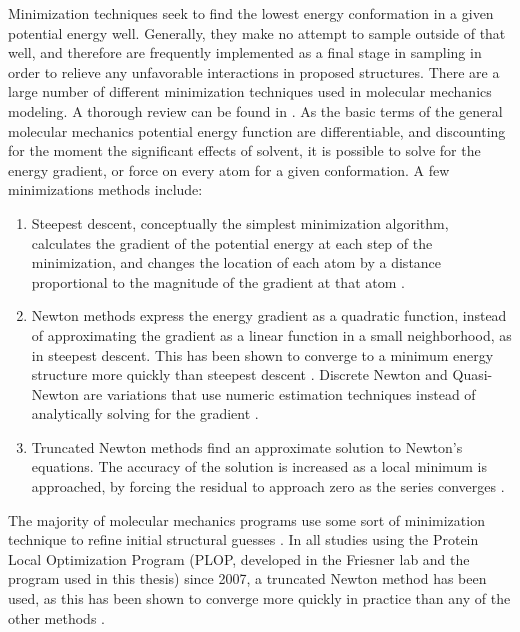 Minimization techniques seek to find the lowest energy conformation in a given potential energy well.
Generally, they make no attempt to sample outside of that well, and therefore are frequently implemented as a final stage in sampling in order to relieve any unfavorable interactions in proposed structures.
There are a large number of different minimization techniques used in molecular mechanics modeling.
A thorough review can be found in \cite{schlick2010molecular}.
As the basic terms of the general molecular mechanics potential energy function are differentiable, and discounting for the moment the significant effects of solvent, it is possible to solve for the energy gradient, or force on every atom for a given conformation.
A few minimizations methods include:
\begin{enumerate}
\item Steepest descent, conceptually the simplest minimization algorithm, calculates the gradient of the potential energy at each step of the minimization, and changes the location of each atom by a distance proportional to the magnitude of the gradient at that atom \cite{levitt1969refinement,bixon1967potential}.
\item Newton methods express the energy gradient as a quadratic function, instead of approximating the gradient as a linear function in a small neighborhood, as in steepest descent.
This has been shown to converge to a minimum energy structure more quickly than steepest descent \cite{ponder1987efficient}.  
Discrete Newton and Quasi-Newton are variations that use numeric estimation techniques instead of analytically solving for the gradient \cite{schlick2010molecular}.
\item Truncated Newton methods find an approximate solution to Newton's equations.
The accuracy of the solution is increased as a local minimum is approached, by forcing the residual to approach zero as the series converges \cite{dembo1983truncated}.
\end{enumerate}

The majority of molecular mechanics programs use some sort of minimization technique to refine initial structural guesses \cite{ponder1987efficient,levitt1969refinement,bixon1967potential,zhu2007multiscale}.
In all studies using the Protein Local Optimization Program (PLOP, developed in the Friesner lab and the program used in this thesis) since 2007, a truncated Newton method has been used, as this has been shown to converge more quickly in practice than any of the other methods \cite{zhu2007multiscale}.



